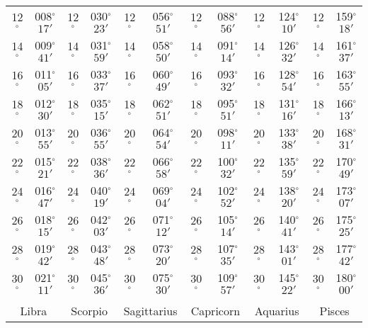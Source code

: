 \begin{table}
{\begin{tabular}{cc|cc|cc|cc|cc|cc}
12$^\circ$ & 008$^\circ$$17'$ & 12$^\circ$ & 030$^\circ$$23'$ & 12$^\circ$ & 056$^\circ$$51'$ & 12$^\circ$ & 088$^\circ$$56'$ & 12$^\circ$ & 124$^\circ$$10'$ & 12$^\circ$ & 159$^\circ$$18'$\\
14$^\circ$ & 009$^\circ$$41'$ & 14$^\circ$ & 031$^\circ$$59'$ & 14$^\circ$ & 058$^\circ$$50'$ & 14$^\circ$ & 091$^\circ$$14'$ & 14$^\circ$ & 126$^\circ$$32'$ & 14$^\circ$ & 161$^\circ$$37'$\\
16$^\circ$ & 011$^\circ$$05'$ & 16$^\circ$ & 033$^\circ$$37'$ & 16$^\circ$ & 060$^\circ$$49'$ & 16$^\circ$ & 093$^\circ$$32'$ & 16$^\circ$ & 128$^\circ$$54'$ & 16$^\circ$ & 163$^\circ$$55'$\\
18$^\circ$ & 012$^\circ$$30'$ & 18$^\circ$ & 035$^\circ$$15'$ & 18$^\circ$ & 062$^\circ$$51'$ & 18$^\circ$ & 095$^\circ$$51'$ & 18$^\circ$ & 131$^\circ$$16'$ & 18$^\circ$ & 166$^\circ$$13'$\\
20$^\circ$ & 013$^\circ$$55'$ & 20$^\circ$ & 036$^\circ$$55'$ & 20$^\circ$ & 064$^\circ$$54'$ & 20$^\circ$ & 098$^\circ$$11'$ & 20$^\circ$ & 133$^\circ$$38'$ & 20$^\circ$ & 168$^\circ$$31'$\\
22$^\circ$ & 015$^\circ$$21'$ & 22$^\circ$ & 038$^\circ$$36'$ & 22$^\circ$ & 066$^\circ$$58'$ & 22$^\circ$ & 100$^\circ$$32'$ & 22$^\circ$ & 135$^\circ$$59'$ & 22$^\circ$ & 170$^\circ$$49'$\\
24$^\circ$ & 016$^\circ$$47'$ & 24$^\circ$ & 040$^\circ$$19'$ & 24$^\circ$ & 069$^\circ$$04'$ & 24$^\circ$ & 102$^\circ$$52'$ & 24$^\circ$ & 138$^\circ$$20'$ & 24$^\circ$ & 173$^\circ$$07'$\\
26$^\circ$ & 018$^\circ$$15'$ & 26$^\circ$ & 042$^\circ$$03'$ & 26$^\circ$ & 071$^\circ$$12'$ & 26$^\circ$ & 105$^\circ$$14'$ & 26$^\circ$ & 140$^\circ$$41'$ & 26$^\circ$ & 175$^\circ$$25'$\\
28$^\circ$ & 019$^\circ$$42'$ & 28$^\circ$ & 043$^\circ$$48'$ & 28$^\circ$ & 073$^\circ$$20'$ & 28$^\circ$ & 107$^\circ$$35'$ & 28$^\circ$ & 143$^\circ$$01'$ & 28$^\circ$ & 177$^\circ$$42'$\\
30$^\circ$ & 021$^\circ$$11'$ & 30$^\circ$ & 045$^\circ$$36'$ & 30$^\circ$ & 075$^\circ$$30'$ & 30$^\circ$ & 109$^\circ$$57'$ & 30$^\circ$ & 145$^\circ$$22'$ & 30$^\circ$ & 180$^\circ$$00'$\\
\multicolumn{12}{c}{}\\
\multicolumn{2}{c}{Libra}\vline & \multicolumn{2}{c}{Scorpio} \vline& \multicolumn{2}{c}{Sagittarius} \vline& \multicolumn{2}{c}{Capricorn}\vline &
\multicolumn{2}{c}{Aquarius}\vline & \multicolumn{2}{c}{Pisces}\\\hline

\end{tabular}}
\end{table}
